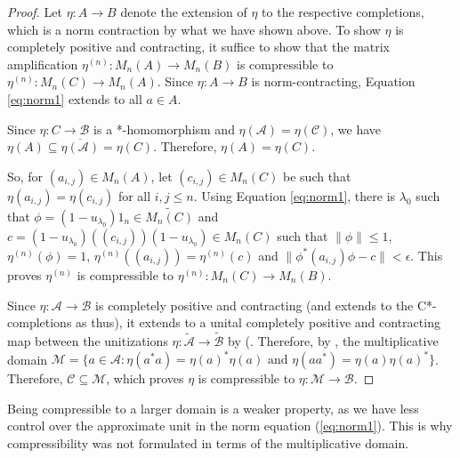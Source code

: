 \documentclass[a4paper, 12pt]{amsart}
\theoremstyle{definition}
\theoremstyle{remark}
\numberwithin{equation}{section}
\begin{document}
\begin{proof}
    Let $\eta:A\to B$ denote the extension of $\eta$ to the respective completions, which is a norm contraction by what we have shown above. To show $\eta$ is completely positive and contracting, it suffice to show that the matrix amplification $\eta^{(n)}:M_{n}(A)\to M_{n}(B)$ is compressible to $\eta^{(n)}:M_{n}(C)\to M_{n}(A)$. Since $\eta:A\to B$ is norm-contracting, Equation \ref{eq:norm1} extends to all $a\in A$.

    Since $\eta:C\to \mathcal{B}$ is a *-homomorphism and $\eta(\mathcal{A}) = \eta(\mathcal{C})$, we have $\eta(A)\subseteq \overline{\eta(\mathcal{A})} = \eta(C).$ Therefore, $\eta(A) = \eta(C)$.
    
    So, for $(a_{i,j})\in M_{n}(A)$, let $(c_{i,j})\in M_{n}(C)$ be such that $\eta(a_{i,j}) = \eta(c_{i,j})$ for all $i,j\leq n$. Using Equation \ref{eq:norm1}, there is $\lambda_{0}$ such that $\phi = (1-u_{\lambda_{0}})1_{n}\in \widetilde{M_{n}(C)}$ and $c = (1-u_{\lambda_{0}})((c_{i,j}))(1-u_{\lambda_{0}})\in M_{n}(C)$ such that $\|\phi\|\leq 1$, $\eta^{(n)}(\phi) = 1$, $\eta^{(n)}((a_{i,j})) = \eta^{(n)}(c)$ and $\|\phi^{*}(a_{i,j})\phi - c\| < \epsilon$. This proves $\eta^{(n)}$ is compressible to $\eta^{(n)}:M_{n}(C)\to M_{n}(B)$.

    Since $\eta:\mathcal{A}\to \mathcal{B}$ is completely positive and contracting (and extends to the C*-completions as thus), it extends to a unital completely positive and contracting map between the unitizations $\eta:\tilde{\mathcal{A}}\to \tilde{\mathcal{B}}$ by (\cite[Proposition~2.2.1]{BO08}. Therefore,  by  \cite[Theorem~3.18]{P03}, the multiplicative domain $\mathcal{M} = \{a\in \mathcal{A}: \eta(a^{*}a) = \eta(a)^{*}\eta(a)\text{ and }\eta(aa^{*}) = \eta(a)\eta(a)^{*}\}$. Therefore, $\mathcal{C}\subseteq \mathcal{M}$, which proves $\eta$ is compressible to $\eta:\mathcal{M}\to \mathcal{B}$.
\end{proof}

Being compressible to a larger domain is a weaker property, as we have less control over the approximate unit in the norm equation (\ref{eq:norm1}). This is why compressibility was not formulated in terms of the multiplicative domain.
\end{document}
